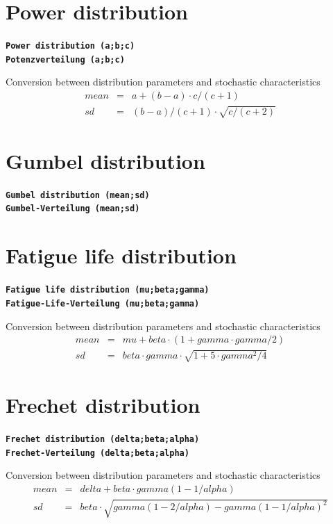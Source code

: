\documentclass{svmono}
\def\cm#1{\textbf{\texttt{#1}}}
\begin{document}
\section*{Power distribution}
\cm{Power distribution (a;b;c)}~\\
\cm{Potenzverteilung (a;b;c)}

Conversion between distribution parameters and stochastic characteristics
\begin{eqnarray*}
mean&=&a+(b-a)\cdot c/(c+1)\\
sd&=&(b-a)/(c+1)\cdot\sqrt{c/(c+2)}
\end{eqnarray*}





\section*{Gumbel distribution}
\cm{Gumbel distribution (mean;sd)}~\\
\cm{Gumbel-Verteilung (mean;sd)}





\section*{Fatigue life distribution}
\cm{Fatigue life distribution (mu;beta;gamma)}~\\
\cm{Fatigue-Life-Verteilung (mu;beta;gamma)}

Conversion between distribution parameters and stochastic characteristics
\begin{eqnarray*}
mean&=&mu+beta\cdot (1+gamma\cdot gamma/2)\\
sd&=&beta\cdot gamma\cdot\sqrt{1+5\cdot gamma^2/4}
\end{eqnarray*}





\section*{Frechet distribution}
\cm{Frechet distribution (delta;beta;alpha)}~\\
\cm{Frechet-Verteilung (delta;beta;alpha)}

Conversion between distribution parameters and stochastic characteristics
\begin{eqnarray*}
mean&=&delta+beta\cdot gamma(1-1/alpha)\\
sd&=&beta\cdot\sqrt{gamma(1-2/alpha)-gamma(1-1/alpha)^2}
\end{eqnarray*}
\end{document}
